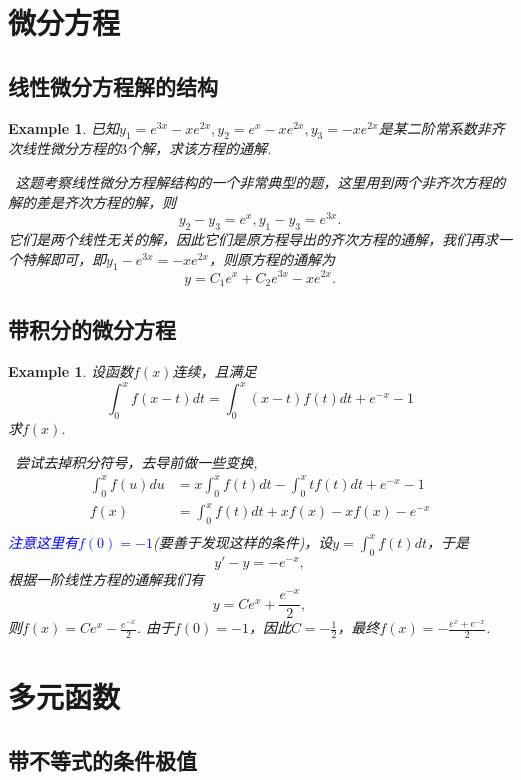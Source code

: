 \documentclass{article}
\newtheorem{example}[theorem]{Example}
\newcommand{\hints}{{\color{blue} \text{hints}}}
\newcommand{\bluet}[1]{\textcolor{blue}{#1}}
\begin{document}
\newpage
\section{微分方程}

\subsection{线性微分方程解的结构}

\begin{example}
\rm 已知$y_1 = e^{3x}-xe^{2x},y_2 = e^x - xe^{2x},y_3 = -xe^{2x}$是某二阶常系数非齐次线性微分方程的$3$个解，求该方程的通解.

\hints\ 这题考察线性微分方程解结构的一个非常典型的题，这里用到两个非齐次方程的解的差是齐次方程的解，则
$$
y_2  - y_3 = e^x , y_1 - y_3 = e^{3x}.
$$
它们是两个线性无关的解，因此它们是原方程导出的齐次方程的通解，我们再求一个特解即可，即$y_1-e^{3x} = -xe^{2x}$，则原方程的通解为
$$
y=C_1e^x + C_2e^{3x}-xe^{2x}. 
$$
\end{example}

\subsection{带积分的微分方程}

\begin{example}
\rm 设函数$f(x)$连续，且满足
$$
\int_0^x f(x-t)dt = \int_0^x (x-t)f(t)dt +e^{-x}-1
$$
求$f(x)$.

\hints\ 尝试去掉积分符号，去导前做一些变换,
$$
\begin{array}{rl}
\int_0^x f(u)du &= x\int_0^x f(t)dt - \int_0^x tf(t)dt + e^{-x}-1 \\
f(x) &= \int_0^x f(t)dt + xf(x)-xf(x)-e^{-x} \\
\end{array}
$$
\bluet{注意这里有$f(0)=-1$}(要善于发现这样的条件)，设$y = \int_0^x f(t)dt$，于是
$$
y'-y = -e^{-x},
$$
根据一阶线性方程的通解我们有
$$
y = Ce^x + \frac{e^{-x}}{2},
$$
则$f(x) = Ce^x -\frac{e^{-x}}{2}$. 由于$f(0)=-1$，因此$C=-\frac{1}{2}$，最终$f(x)= -\frac{e^{x}+e^{-x}}{2}$. 
\end{example}

\newpage

\section{多元函数}

\subsection{带不等式的条件极值}
\end{document}

